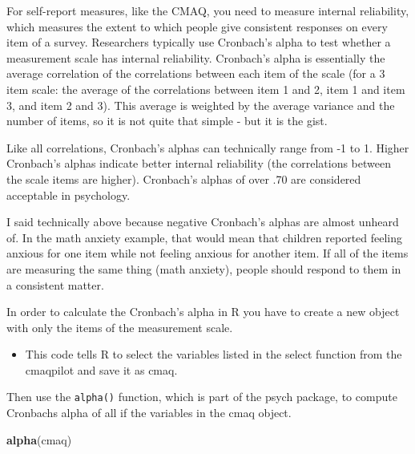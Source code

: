 \documentclass[
]{book}
\newenvironment{Shaded}{\begin{snugshade}}{\end{snugshade}}
\newcommand{\KeywordTok}[1]{\textcolor[rgb]{0.13,0.29,0.53}{\textbf{#1}}}
\newcommand{\NormalTok}[1]{#1}
\newcommand{\OperatorTok}[1]{\textcolor[rgb]{0.81,0.36,0.00}{\textbf{#1}}}
\newcommand{\StringTok}[1]{\textcolor[rgb]{0.31,0.60,0.02}{#1}}
\providecommand{\tightlist}{%
  \setlength{\itemsep}{0pt}\setlength{\parskip}{0pt}}
\begin{document}
For self-report measures, like the CMAQ, you need to measure internal reliability, which measures the extent to which people give consistent responses on every item of a survey. Researchers typically use Cronbach's alpha to test whether a measurement scale has internal reliability. Cronbach's alpha is essentially the average correlation of the correlations between each item of the scale (for a 3 item scale: the average of the correlations between item 1 and 2, item 1 and item 3, and item 2 and 3). This average is weighted by the average variance and the number of items, so it is not quite that simple - but it is the gist.

Like all correlations, Cronbach's alphas can technically range from -1 to 1. Higher Cronbach's alphas indicate better internal reliability (the correlations between the scale items are higher). Cronbach's alphas of over .70 are considered acceptable in psychology.

I said technically above because negative Cronbach's alphas are almost unheard of. In the math anxiety example, that would mean that children reported feeling anxious for one item while not feeling anxious for another item. If all of the items are measuring the same thing (math anxiety), people should respond to them in a consistent matter.

In order to calculate the Cronbach's alpha in R you have to create a new object with only the items of the measurement scale.

\begin{Shaded}
\end{Shaded}

\begin{itemize}
\tightlist
\item
  This code tells R to select the variables listed in the select function from the cmaqpilot and save it as cmaq.
\end{itemize}

Then use the \texttt{alpha()} function, which is part of the psych package, to compute Cronbachs alpha of all if the variables in the cmaq object.

\begin{Shaded}
\begin{Highlighting}[]
\KeywordTok{alpha}\NormalTok{(cmaq)}
\end{Highlighting}
\end{Shaded}
\end{document}
